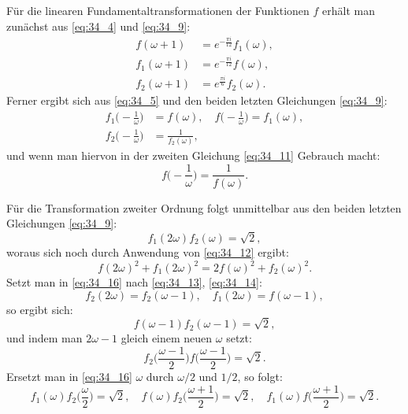 \documentclass[12pt,a4paper]{article}
\begin{document}
F\"ur die linearen Fundamentaltransformationen der Funktionen $f$ erh\"alt man zun\"achst aus \eqref{eq:34_4} und \eqref{eq:34_9}:
\begin{equation}\label{eq:34_13}
\begin{aligned}
f(\omega+1) &= e^{-\frac{\pi i}{12}}f_1(\omega),\\
f_1(\omega+1) &= e^{-\frac{\pi i}{12}}f(\omega),\\
f_2(\omega+1) &= e^{\frac{\pi i}{6}}f_2(\omega).
\end{aligned}
\end{equation}
Ferner ergibt sich aus \eqref{eq:34_5} und den beiden letzten Gleichungen \eqref{eq:34_9}:
\begin{equation}\label{eq:34_14}
\begin{aligned}
f_1\bigl(-\frac{1}{\omega}\bigr) &= f(\omega),\quad
f\bigl(-\frac{1}{\omega}\bigr) = f_1(\omega),\\
f_2\bigl(-\frac{1}{\omega}\bigr) &= \frac{1}{f_2(\omega)},
\end{aligned}
\end{equation}
und wenn man hiervon in der zweiten Gleichung \eqref{eq:34_11} Gebrauch macht:
\begin{equation}\label{eq:34_15}
f\bigl(-\frac{1}{\omega}\bigr) = \frac{1}{f(\omega)}.
\end{equation}

F\"ur die Transformation zweiter Ordnung folgt unmittelbar aus den beiden letzten Gleichungen \eqref{eq:34_9}:
\begin{equation}\label{eq:34_16}
f_1(2\omega)f_2(\omega) = \sqrt{2},
\end{equation}
woraus sich noch durch Anwendung von \eqref{eq:34_12} ergibt:
\begin{equation}\label{eq:34_17}
f(2\omega)^2 + f_1(2\omega)^2 = 2f(\omega)^2 + f_2(\omega)^2.
\end{equation}
Setzt man in \eqref{eq:34_16} nach \eqref{eq:34_13}, \eqref{eq:34_14}:
\[
f_2(2\omega) = f_2(\omega-1),\quad f_1(2\omega) = f(\omega-1),
\]
so ergibt sich:
\[
f(\omega-1)f_2(\omega-1) = \sqrt{2},
\]
und indem man $2\omega-1$ gleich einem neuen $\omega$ setzt:
\[
f_2\bigl(\frac{\omega-1}{2}\bigr)f\bigl(\frac{\omega-1}{2}\bigr) = \sqrt{2}.
\]
Ersetzt man in \eqref{eq:34_16} $\omega$ durch $\omega/2$ und $1/2$, so folgt:
\[
f_1(\omega)f_2\bigl(\frac{\omega}{2}\bigr) = \sqrt{2},\quad
f(\omega)f_2\bigl(\frac{\omega+1}{2}\bigr) = \sqrt{2},\quad
f_1(\omega)f\bigl(\frac{\omega+1}{2}\bigr) = \sqrt{2}.
\]
\end{document}
